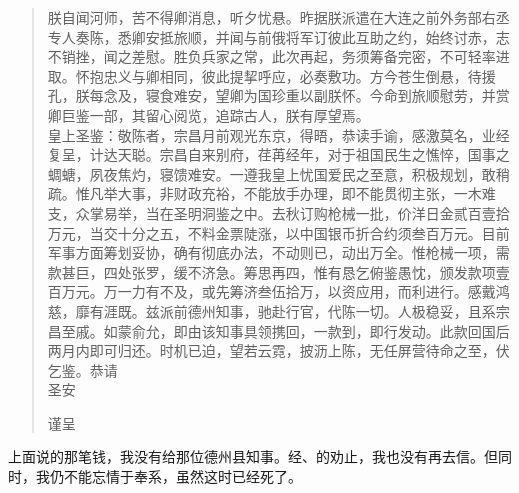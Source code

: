 \begin{quote}
	朕自闻河师，苦不得卿消息，听夕忧悬。昨据朕派遣在大连之前外务部右丞专人奏陈，悉卿安抵旅顺，并闻与前俄将军订彼此互助之约，始终讨赤，志不销挫，闻之差慰。胜负兵家之常，此次再起，务须筹备完密，不可轻率进取。怀抱忠义与卿相同，彼此提挈呼应，必奏敷功。方今苍生倒悬，待援孔，朕每念及，寝食难安，望卿为国珍重以副朕怀。今命到旅顺慰劳，并赏卿巨鉴一部，其留心阅览，追踪古人，朕有厚望焉。\\

皇上圣鉴：敬陈者，宗昌月前观光东京，得晤，恭读手谕，感激莫名，业经复呈，计达天聪。宗昌自来别府，荏苒经年，对于祖国民生之憔悴，国事之蜩螗，夙夜焦灼，寝馈难安。一遵我皇上忧国爱民之至意，积极规划，敢稍疏。惟凡举大事，非财政充裕，不能放手办理，即不能贯彻主张，一木难支，众掌易举，当在圣明洞鉴之中。去秋订购枪械一批，价洋日金贰百壹拾万元，当交十分之五，不料金票陡涨，以中国银币折合约须叁百万元。目前军事方面筹划妥协，确有彻底办法，不动则已，动出万全。惟枪械一项，需款甚巨，四处张罗，缓不济急。筹思再四，惟有恳乞俯鉴愚忱，颁发款项壹百万元。万一力有不及，或先筹济叁伍拾万，以资应用，而利进行。感戴鸿慈，靡有涯既。兹派前德州知事，驰赴行官，代陈一切。人极稳妥，且系宗昌至戚。如蒙俞允，即由该知事具领携回，一款到，即行发动。此款回国后两月内即可归还。时机已迫，望若云霓，披沥上陈，无任屏营待命之至，伏乞鉴。恭请\\

圣安\\

\begin{flushright}
	谨呈\\
\end{flushright}
\end{quote}

上面说的那笔钱，我没有给那位德州县知事。经、的劝止，我也没有再去信。但同时，我仍不能忘情于奉系，虽然这时已经死了。\\

